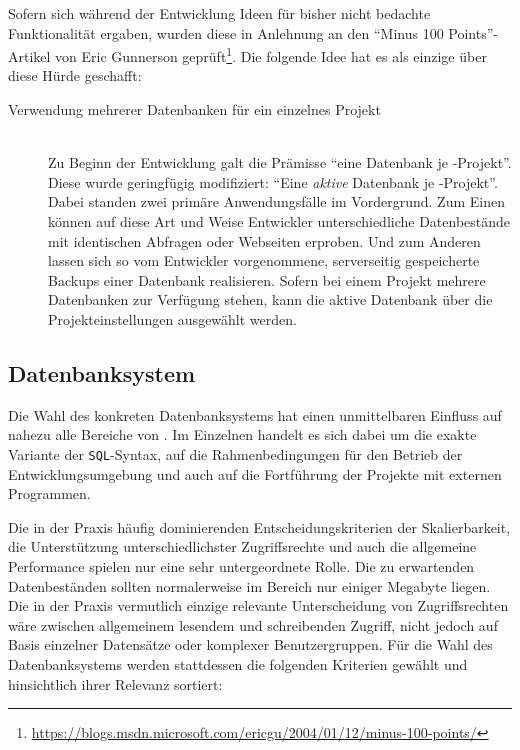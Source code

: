 Sofern sich während der Entwicklung Ideen für bisher nicht bedachte Funktionalität ergaben, wurden diese in Anlehnung an den "`Minus 100 Points"'-Artikel von Eric Gunnerson geprüft\footnote{\url{https://blogs.msdn.microsoft.com/ericgu/2004/01/12/minus-100-points/}}. Die folgende Idee hat es als einzige über diese Hürde geschafft:

\begin{description}
\item[Verwendung mehrerer Datenbanken für ein einzelnes Projekt] \hfill\\
  Zu Beginn der Entwicklung galt die Prämisse "`eine Datenbank je \idename{}-Projekt"'. Diese wurde geringfügig modifiziert: "`Eine \textit{aktive} Datenbank je \idename{}-Projekt"'. Dabei standen zwei primäre Anwendungsfälle im Vordergrund. Zum Einen können auf diese Art und Weise Entwickler unterschiedliche Datenbestände mit identischen Abfragen oder Webseiten erproben. Und zum Anderen lassen sich so vom Entwickler vorgenommene, serverseitig gespeicherte Backups einer Datenbank realisieren. Sofern bei einem Projekt mehrere Datenbanken zur Verfügung stehen, kann die aktive Datenbank über die Projekteinstellungen ausgewählt werden.
\end{description}

\subsection{Datenbanksystem}
\label{sec:implementation-database-system}

Die Wahl des konkreten Datenbanksystems hat einen unmittelbaren Einfluss auf nahezu alle Bereiche von \idename. Im Einzelnen handelt es sich dabei um die exakte Variante der \texttt{SQL}-Syntax, auf die Rahmenbedingungen für den Betrieb der Entwicklungsumgebung und auch auf die Fortführung der Projekte mit externen Programmen.

Die in der Praxis häufig dominierenden Entscheidungskriterien der Skalierbarkeit, die Unterstützung unterschiedlichster Zugriffsrechte und auch die allgemeine Performance spielen nur eine sehr untergeordnete Rolle. Die zu erwartenden Datenbeständen sollten normalerweise im Bereich nur einiger Megabyte liegen. Die in der Praxis vermutlich einzige relevante Unterscheidung von Zugriffsrechten wäre zwischen allgemeinem lesendem und schreibenden Zugriff, nicht jedoch auf Basis einzelner Datensätze oder komplexer Benutzergruppen. Für die Wahl des Datenbanksystems werden stattdessen die folgenden Kriterien gewählt und hinsichtlich ihrer Relevanz sortiert:

